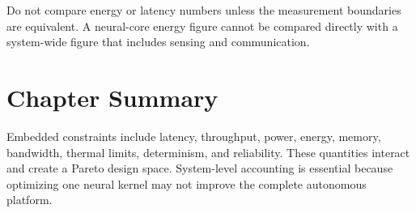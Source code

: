 \begin{engineeringcheck}
Do not compare energy or latency numbers unless the measurement boundaries are equivalent. A neural-core energy figure cannot be compared directly with a system-wide figure that includes sensing and communication.
\end{engineeringcheck}

\section{Chapter Summary}

Embedded constraints include latency, throughput, power, energy, memory, bandwidth, thermal limits, determinism, and reliability. These quantities interact and create a Pareto design space. System-level accounting is essential because optimizing one neural kernel may not improve the complete autonomous platform.
